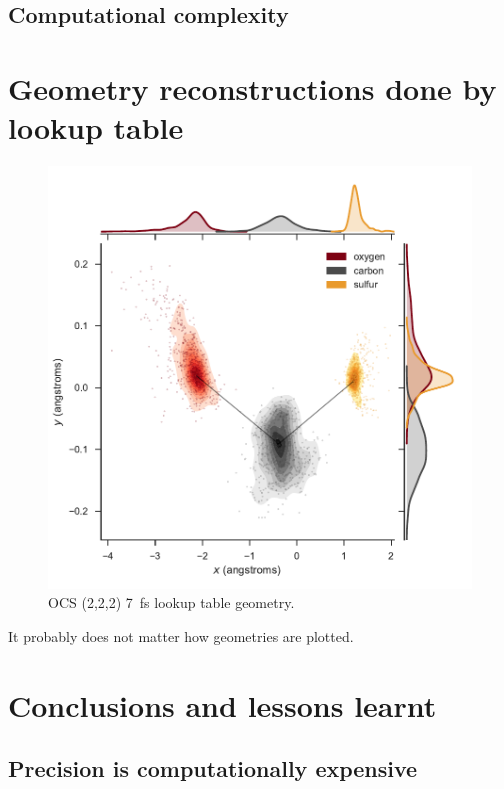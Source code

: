\subsection{Computational complexity}

\section{Geometry reconstructions done by lookup table}

\pagebreak
\begin{figure}
  \centering
  \includegraphics[width=\textwidth]{Plots/OCS2227fsLTGeometry}
  \caption[OCS (2,2,2) \SI{7}{\fs} lookup table geometry.]
  {OCS (2,2,2) \SI{7}{\fs} lookup table geometry.}
  \label{fig:OCS2227fsLTGeometry}
\end{figure}

It probably does not matter how geometries are plotted. 

\clearpage

\section{Conclusions and lessons learnt}
\subsection{Precision is computationally expensive}
